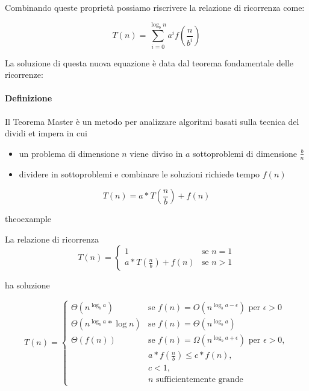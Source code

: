 Combinando queste proprietà possiamo riscrivere la relazione di ricorrenza come:

\begin{equation}
T(n) = \sum_{i=0}^{\log_b{n}}{a^if\left(\frac{n}{b^i}\right)}
\end{equation}

La soluzione di questa nuova equazione è data dal teorema fondamentale delle ricorrenze:

\paragraph{Definizione}

Il Teorema Master è un metodo per analizzare algoritmi basati sulla tecnica del dividi et impera in cui

\begin{itemize}
\item un problema di dimensione $n$ viene diviso in $a$ sottoproblemi di dimensione $\frac{b}{n}$
\item dividere in sottoproblemi e combinare le soluzioni richiede tempo $f(n)$
\end{itemize}

\begin{equation}
T(n) = a * T\left(\frac{n}{b}\right) + f(n)
\end{equation}


\begin{teorema}{}{theoexample}

La relazione di ricorrenza
\begin{equation}
T(n) = 
\begin{cases}
1							& \mbox{se } n = 1\\ 
a*T(\frac{n}{b}) + f(n)		& \mbox{se } n > 1
\end{cases}
\end{equation}

ha soluzione

\begin{equation}
T(n) = 
\begin{cases}
\Theta(n^{\log_b{a}})			& \mbox{se } f(n) = O(n^{\log_b{a} - \epsilon}) \mbox{ per } \epsilon > 0\\ 
\Theta(n^{\log_b{a}}*\log{n})			& \mbox{se } f(n) = \Theta(n^{\log_b{a}})  \\ 
\Theta(f(n))			& \mbox{se } f(n) = \Omega(n^{\log_b{a} + \epsilon})  \mbox{ per } \epsilon > 0, \\ 
& a*f(\frac{n}{b}) \leq c*f(n), \\ 
& c < 1, \\
& n \mbox{ sufficientemente grande}
\end{cases}
\end{equation}

\end{teorema}

